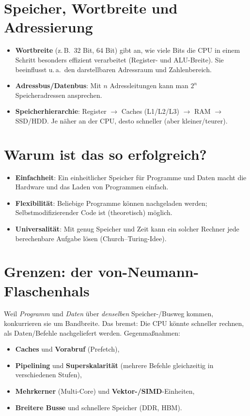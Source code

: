 \documentclass[../skript/main.tex]{subfiles}
\begin{document}
\section{Speicher, Wortbreite und Adressierung}
\begin{itemize}
	\item \textbf{Wortbreite} (z.\,B.\ 32 Bit, 64 Bit) gibt an, wie viele Bits die CPU in einem Schritt besonders effizient verarbeitet
	(Register- und ALU-Breite). Sie beeinflusst u.\,a.\ den darstellbaren Adressraum und Zahlenbereich.
	\item \textbf{Adressbus/Datenbus}: Mit \(n\) Adressleitungen kann man \(2^n\) Speicheradressen ansprechen.
	\item \textbf{Speicherhierarchie}: Register \(\rightarrow\) Caches (L1/L2/L3) \(\rightarrow\) RAM \(\rightarrow\) SSD/HDD.
	Je näher an der CPU, desto schneller (aber kleiner/teurer).
\end{itemize}

\section{Warum ist das so erfolgreich?}
\begin{itemize}
	\item \textbf{Einfachheit}: Ein einheitlicher Speicher für Programme und Daten macht die Hardware und das Laden von Programmen einfach.
	\item \textbf{Flexibilität}: Beliebige Programme können nachgeladen werden; Selbstmodifizierender Code ist (theoretisch) möglich.
	\item \textbf{Universalität}: Mit genug Speicher und Zeit kann ein solcher Rechner jede berechenbare Aufgabe lösen (Church–Turing-Idee).
\end{itemize}

\section{Grenzen: der von-Neumann-Flaschenhals}
Weil \emph{Programm} und \emph{Daten} über \emph{denselben} Speicher-/Busweg kommen, konkurrieren sie um Bandbreite.
Das bremst: Die CPU könnte schneller rechnen, als Daten/Befehle nachgeliefert werden. Gegenmaßnahmen:
\begin{itemize}
	\item \textbf{Caches} und \textbf{Vorabruf} (Prefetch),
	\item \textbf{Pipelining} und \textbf{Superskalarität} (mehrere Befehle gleichzeitig in verschiedenen Stufen),
	\item \textbf{Mehrkerner} (Multi-Core) und \textbf{Vektor-/SIMD}-Einheiten,
	\item \textbf{Breitere Busse} und schnellere Speicher (DDR, HBM).
\end{itemize}
\end{document}
